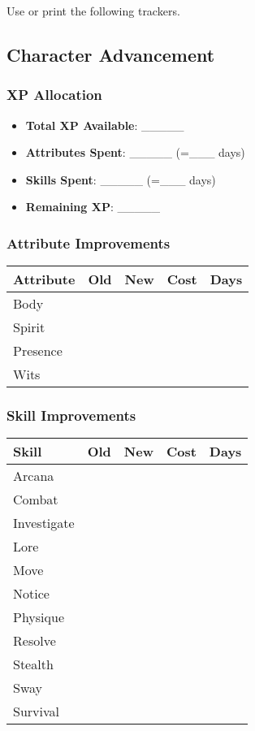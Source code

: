 Use or print the following trackers.

\subsection{Character Advancement}
\subsubsection*{XP Allocation}
\begin{itemize}
  \item \textbf{Total XP Available}: \_\_\_\_\_
  \item \textbf{Attributes Spent}: \_\_\_\_\_ (=\_\_\_ days)
  \item \textbf{Skills Spent}: \_\_\_\_\_ (=\_\_\_ days)
  \item \textbf{Remaining XP}: \_\_\_\_\_
\end{itemize}

\subsubsection*{Attribute Improvements}
\begin{tabular}{|p{3cm}|c|c|c|c|}
\hline
\textbf{Attribute} & \textbf{Old} & \textbf{New} & \textbf{Cost} & \textbf{Days} \\
\hline
Body & & & & \\
Spirit & & & & \\
Presence & & & & \\
Wits & & & & \\
\hline
\end{tabular}

\subsubsection*{Skill Improvements}
\begin{tabular}{|p{4cm}|c|c|c|c|}
\hline
\textbf{Skill} & \textbf{Old} & \textbf{New} & \textbf{Cost} & \textbf{Days} \\
\hline
Arcana & & & & \\
Combat & & & & \\
Investigate & & & & \\
Lore & & & & \\
Move & & & & \\
Notice & & & & \\
Physique & & & & \\
Resolve & & & & \\
Stealth & & & & \\
Sway & & & & \\
Survival & & & & \\
\hline
\end{tabular}

